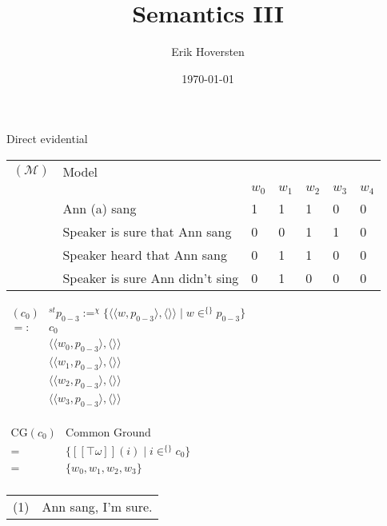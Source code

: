 \documentclass{article}
\title{Semantics III}
\author{Erik Hoversten}
\date{\today}
\renewcommand{\llbracket}{[\![}
\renewcommand{\rrbracket}{]\!]}
\newcommand{\tw}{\top\omega}
\begin{document}
Direct evidential

\vspace{5mm}
\begin{tabular}{lllllll}
$(\mathcal{M})$ & Model & & & & & \\
& & $w_0$ & $w_1$ & $w_2$ & $w_3$ & $w_4$ \\
& Ann (a) sang & 1 & 1 & 1& 0 & 0 \\
& Speaker is sure that Ann sang & 0 & 0 & 1 & 1& 0 \\
& Speaker heard that Ann sang & 0 & 1 & 1 & 0 & 0 \\
& Speaker is sure Ann didn't sing & 0 & 1 & 0 & 0 & 0 \\
\end{tabular}

\vspace{5mm}
$\begin{array}{ll}
(c_0) & ^{st}p_{0-3} := ^{\chi}\{\langle\langle w,p_{0-3}\rangle,\langle\rangle\rangle\;|\;w\in ^{\{\}}p_{0-3}\} \\
=: & c_0 \\
& \langle\langle w_0,p_{0-3}\rangle,\langle\rangle\rangle \\
& \langle\langle w_1,p_{0-3}\rangle,\langle\rangle\rangle \\
& \langle\langle w_2,p_{0-3}\rangle,\langle\rangle\rangle \\
& \langle\langle w_3,p_{0-3}\rangle,\langle\rangle\rangle \\
\end{array}$

\vspace{5mm}
$\begin{array}{ll}
\textrm{CG}(c_0) & \textrm{Common Ground} \\
= & \{\llbracket\tw\rrbracket(i)\;|\;i\in ^{\{\}}c_0\} \\
= & \{w_0,w_1,w_2,w_3\} \\
\end{array}$

\vspace{5mm}
\begin{tabular}{ll}
(1) & Ann sang, I'm sure.
\end{tabular}
\end{document}
